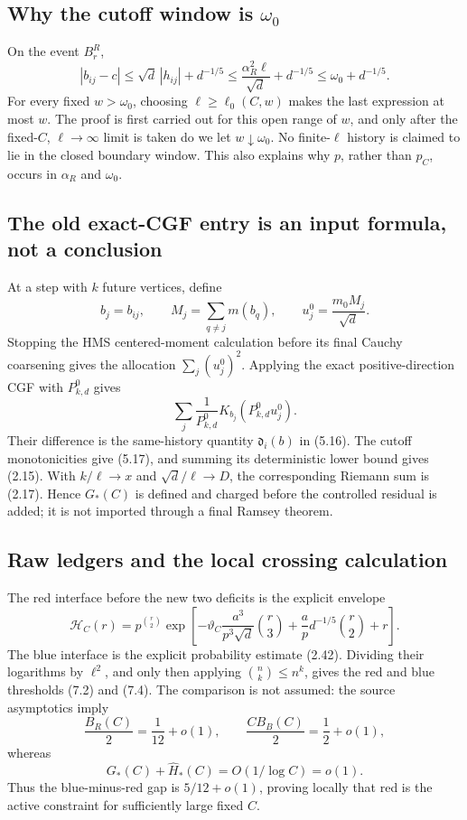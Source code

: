 \subsection{Why the cutoff window is
\texorpdfstring{\(\omega_0\)}{omega-0}}

On the event \(B^R_r\),
\[
 |b_{ij}-c|\le
 \sqrt d\,|h_{ij}|+d^{-1/5}
 \le\frac{\alpha_R^2\ell}{\sqrt d}+d^{-1/5}
 \le\omega_0+d^{-1/5}.
\tag{B.1}
\]
For every fixed \(w>\omega_0\), choosing
\(\ell\ge\ell_0(C,w)\) makes the last expression at most \(w\).
The proof is first carried out for this open range of \(w\), and only after
the fixed-\(C\), \(\ell\to\infty\) limit is taken do we let
\(w\downarrow\omega_0\).  No finite-\(\ell\) history is claimed to lie in
the closed boundary window.  This also explains why \(p\), rather than
\(p_C\), occurs in \(\alpha_R\) and \(\omega_0\).

\subsection{The old exact-CGF entry is an input formula, not a conclusion}

At a step with \(k\) future vertices, define
\[
 b_j=b_{ij},\qquad
 M_j=\sum_{q\ne j}m(b_q),\qquad
 u_j^0=\frac{m_0M_j}{\sqrt d}.
\tag{B.2}
\]
Stopping the HMS centered-moment calculation before its final Cauchy
coarsening gives the allocation \(\sum_j(u_j^0)^2\).  Applying the exact
positive-direction CGF with \(P^0_{k,d}\) gives
\[
 \sum_j\frac1{P^0_{k,d}}K_{b_j}(P^0_{k,d}u_j^0).
\tag{B.3}
\]
Their difference is the same-history quantity \(\mathfrak d_i(b)\) in
(5.16).  The cutoff monotonicities give (5.17), and summing its deterministic
lower bound gives (2.15).  With \(k/\ell\to x\) and
\(\sqrt d/\ell\to D\), the corresponding Riemann sum is (2.17).  Hence
\(G_*(C)\) is defined and charged before the controlled residual is added;
it is not imported through a final Ramsey theorem.

\subsection{Raw ledgers and the local crossing calculation}

The red interface before the new two deficits is the explicit envelope
\[
 \mathcal H_C(r)=p^{\binom r2}
 \exp\left[-\vartheta_C\frac{a^3}{p^3\sqrt d}\binom r3
 +\frac apd^{-1/5}\binom r2+r\right].
\tag{B.4}
\]
The blue interface is the explicit probability estimate (2.42).  Dividing
their logarithms by \(\ell^2\), and only then applying
\(\binom nk\le n^k\), gives the red and blue thresholds (7.2) and (7.4).
The comparison is not assumed: the source asymptotics imply
\[
 \frac{B_R(C)}2=\frac1{12}+o(1),\qquad
 \frac{CB_B(C)}2=\frac12+o(1),
\tag{B.5}
\]
whereas
\[
 G_*(C)+\widehat H_*(C)=O(1/\log C)=o(1).
\tag{B.6}
\]
Thus the blue-minus-red gap is \(5/12+o(1)\), proving locally that red is
the active constraint for sufficiently large fixed \(C\).

